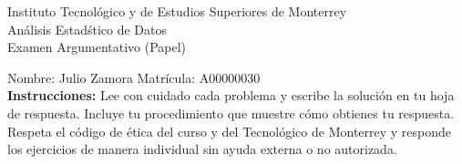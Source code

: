 \documentclass[10pt]{report}
\begin{document}
\newpage



\begin{center}
{\large Instituto Tecnol\'{o}gico y de Estudios Superiores de Monterrey \\
An\'alisis Estad\'stico de Datos } \\
Examen Argumentativo (Papel)
\end{center}

Nombre: \underline{\hspace*{.2in}}
Julio Zamora
\underline{\hspace*{.2in}} \quad Matr\'icula:\underline{\hspace*{.2in}}
A00000030
\underline{\hspace*{.2in}} \\

{\bf Instrucciones:} Lee con cuidado cada problema y escribe la soluci\'on
en tu hoja de respuesta. Incluye tu procedimiento que muestre c\'omo obtienes tu respuesta.  Respeta el c\'odigo de \'etica del curso y del Tecnol\'ogico de Monterrey y responde los ejercicios de manera individual sin ayuda externa o no autorizada.
\end{document}
